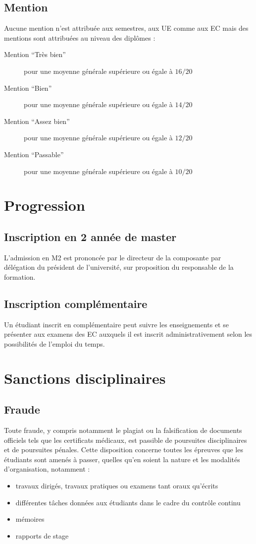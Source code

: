 \documentclass[a4paper,11pt]{article}
\begin{document}
\subsection{Mention}
Aucune mention n'est attribuée aux semestres, aux UE comme aux EC mais des mentions sont attribuées au niveau des diplômes :
\begin{description}
	\item[Mention ``Très bien'']	 pour une moyenne générale supérieure ou égale à $16/20$
\item[Mention ``Bien''] pour une moyenne générale supérieure ou égale à $14/20$
\item[Mention ``Assez bien''] pour une moyenne générale supérieure ou égale à $12/20$
\item[Mention ``Passable''] pour une moyenne générale supérieure ou égale à $10/20$
\end{description}




\section{Progression}\label{Progression}
\subsection{Inscription en 2\ieme{} année de master}
L'admission en M2 est prononcée par le directeur de la composante par délégation du président de l'université, sur proposition du responsable de la formation.

\subsection{Inscription complémentaire}
Un étudiant inscrit en complémentaire peut suivre les enseignements et se présenter aux examens des EC auxquels il est inscrit administrativement selon les possibilités de l'emploi du temps.


\section{Sanctions disciplinaires}

\subsection{Fraude}
Toute fraude, y compris notamment le plagiat ou la falsification de documents officiels tels que les certificats médicaux, est passible de poursuites disciplinaires et de poursuites pénales. Cette disposition concerne toutes les épreuves que les étudiants sont amenés à passer, quelles qu'en soient la nature et les modalités d'organisation, notamment :
\begin{itemize}
	\item travaux dirigés, travaux pratiques ou examens tant oraux qu'écrits
	\item différentes tâches données aux étudiants dans le cadre du contrôle continu
	\item mémoires
	\item rapports de stage
\end{itemize}
\end{document}
